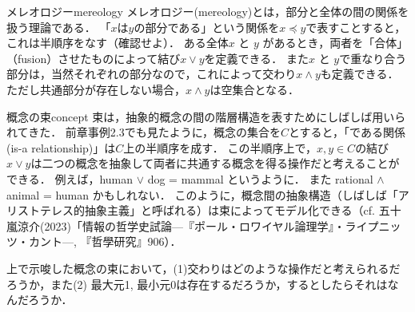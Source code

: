 \documentclass[11pt,a4paper, dvipdfmx]{jsarticle}
\begin{document}
\begin{rei}{メレオロジー}{mereology}
メレオロジー(mereology)とは，部分と全体の間の関係を扱う理論である．
「$x$は$y$の部分である」という関係を$x \preceq y$で表すことすると，これは半順序をなす（確認せよ）．
ある全体$x$ と $y$ があるとき，両者を「合体」（fusion）させたものによって結び$x \vee y$を定義できる．
また$x$ と $y$で重なり合う部分は，当然それぞれの部分なので，これによって交わり$x \wedge y$も定義できる．ただし共通部分が存在しない場合，$x \wedge y$は空集合となる．
\end{rei}

\begin{rei}{概念の束}{concept}
束は，抽象的概念の間の階層構造を表すためにしばしば用いられてきた．
前章事例2.3でも見たように，概念の集合を$C$とすると，「である関係(is-a relationship)」は$C$上の半順序を成す．
この半順序上で，$x, y \in C$の結び$x \vee y$は二つの概念を抽象して両者に共通する概念を得る操作だと考えることができる．
例えば，human $\vee$ dog = mammal というように．
また rational $\wedge$ animal = human かもしれない．
このように，概念間の抽象構造（しばしば「アリストテレス的抽象主義」と呼ばれる）は束によってモデル化できる（cf. 五十嵐涼介(2023)「情報の哲学史試論---『ポール・ロワイヤル論理学』・ライプニッツ・カント---, 『哲學研究』906）．
\end{rei}

\begin{renshu}{}{}
上で示唆した概念の束において，(1)交わりはどのような操作だと考えられるだろうか，また(2) 最大元1, 最小元0は存在するだろうか，するとしたらそれはなんだろうか．
\end{renshu}
\end{document}
